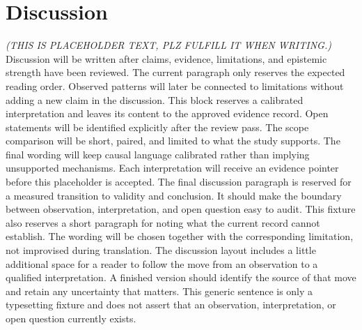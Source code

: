 \section{Discussion}\label{sec:discussion}
\textit{(THIS IS PLACEHOLDER TEXT, PLZ FULFILL IT WHEN WRITING.)}
Discussion will be written after claims, evidence, limitations, and epistemic strength have been reviewed. The current paragraph only reserves the expected reading order.
Observed patterns will later be connected to limitations without adding a new claim in the discussion.
This block reserves a calibrated interpretation and leaves its content to the approved evidence record.
Open statements will be identified explicitly after the review pass.
The scope comparison will be short, paired, and limited to what the study supports.
The final wording will keep causal language calibrated rather than implying unsupported mechanisms.
Each interpretation will receive an evidence pointer before this placeholder is accepted.
The final discussion paragraph is reserved for a measured transition to validity and conclusion. It should make the boundary between observation, interpretation, and open question easy to audit.
This fixture also reserves a short paragraph for noting what the current record cannot establish. The wording will be chosen together with the corresponding limitation, not improvised during translation.
The discussion layout includes a little additional space for a reader to follow the move from an observation to a qualified interpretation. A finished version should identify the source of that move and retain any uncertainty that matters. This generic sentence is only a typesetting fixture and does not assert that an observation, interpretation, or open question currently exists.

